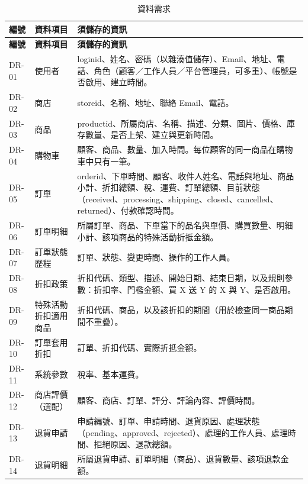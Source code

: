 \documentclass[12pt,a4paper]{article}
\begin{document}
\begin{xltabular}{\linewidth}{|>{\centering\arraybackslash}p{1.3cm}|>{\centering\arraybackslash}p{2.4cm}|X|}
\caption{資料需求}\\
\hline{}\textbf{編號} & \textbf{資料項目} & \textbf{須儲存的資訊}\\\hline\endfirsthead
\hline{}\textbf{編號} & \textbf{資料項目} & \textbf{須儲存的資訊}\\\hline\endhead
DR-01 & 使用者 & loginid、姓名、密碼（以雜湊值儲存）、Email、地址、電話、角色（顧客／工作人員／平台管理員，可多重）、帳號是否啟用、建立時間。\\\hline
DR-02 & 商店 & storeid、名稱、地址、聯絡 Email、電話。\\\hline
DR-03 & 商品 & productid、所屬商店、名稱、描述、分類、圖片、價格、庫存數量、是否上架、建立與更新時間。\\\hline
DR-04 & 購物車 & 顧客、商品、數量、加入時間。每位顧客的同一商品在購物車中只有一筆。\\\hline
DR-05 & 訂單 & orderid、下單時間、顧客、收件人姓名、電話與地址、商品小計、折扣總額、稅、運費、訂單總額、目前狀態（received、processing、shipping、closed、cancelled、returned）、付款確認時間。\\\hline
DR-06 & 訂單明細 & 所屬訂單、商品、下單當下的品名與單價、購買數量、明細小計、該項商品的特殊活動折抵金額。\\\hline
DR-07 & 訂單狀態歷程 & 訂單、狀態、變更時間、操作的工作人員。\\\hline
DR-08 & 折扣政策 & 折扣代碼、類型、描述、開始日期、結束日期，以及規則參數：折扣率、門檻金額、買 X 送 Y 的 X 與 Y、是否啟用。\\\hline
DR-09 & 特殊活動折扣適用商品 & 折扣代碼、商品，以及該折扣的期間（用於檢查同一商品期間不重疊）。\\\hline
DR-10 & 訂單套用折扣 & 訂單、折扣代碼、實際折抵金額。\\\hline
DR-11 & 系統參數 & 稅率、基本運費。\\\hline
DR-12 & 商店評價（選配） & 顧客、商店、訂單、評分、評論內容、評價時間。\\\hline
DR-13 & 退貨申請 & 申請編號、訂單、申請時間、退貨原因、處理狀態（pending、approved、rejected）、處理的工作人員、處理時間、拒絕原因、退款總額。\\\hline
DR-14 & 退貨明細 & 所屬退貨申請、訂單明細（商品）、退貨數量、該項退款金額。\\\hline
\end{xltabular}
\end{document}
